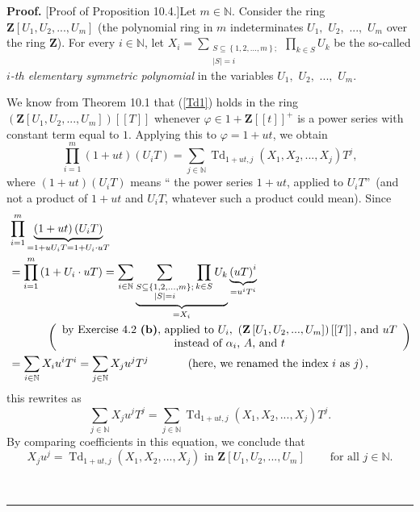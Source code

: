 \documentclass[numbers=enddot,12pt,final,onecolumn,notitlepage]{scrartcl}%
\newenvironment{proof}[1][Proof]{\noindent\textbf{#1.} }{\ \rule{0.5em}{0.5em}}
\begin{document}
\begin{proof}
[Proof of Proposition 10.4.]Let $m\in\mathbb{N}$. Consider the ring
$\mathbf{Z}\left[  U_{1},U_{2},...,U_{m}\right]  $ (the polynomial ring in $m$
indeterminates $U_{1},$ $U_{2},$ $...,$ $U_{m}$ over the ring $\mathbf{Z}$).
For every $i\in\mathbb{N}$, let $X_{i}=\sum\limits_{\substack{S\subseteq
\left\{  1,2,...,m\right\}  ;\\\left\vert S\right\vert =i}}\prod\limits_{k\in
S}U_{k}$ be the so-called $i$\textit{-th elementary symmetric polynomial} in
the variables $U_{1},$ $U_{2},$ $...,$ $U_{m}$.

We know from Theorem 10.1 that (\ref{Td1}) holds in the ring $\left(
\mathbf{Z}\left[  U_{1},U_{2},...,U_{m}\right]  \right)  \left[  \left[
T\right]  \right]  $ whenever $\varphi\in1+\mathbf{Z}\left[  \left[  t\right]
\right]  ^{+}$ is a power series with constant term equal to $1$. Applying
this to $\varphi=1+ut$, we obtain%
\[
\prod\limits_{i=1}^{m}\left(  1+ut\right)  \left(  U_{i}T\right)  =\sum
_{j\in\mathbb{N}}\operatorname*{Td}\nolimits_{1+ut,j}\left(  X_{1}%
,X_{2},...,X_{j}\right)  T^{j},
\]
where $\left(  1+ut\right)  \left(  U_{i}T\right)  $ means \textquotedblleft
the power series $1+ut$, applied to $U_{i}T$\textquotedblright\ (and not a
product of $1+ut$ and $U_{i}T$, whatever such a product could mean). Since%
\begin{align*}
&  \prod\limits_{i=1}^{m}\underbrace{\left(  1+ut\right)  \left(
U_{i}T\right)  }_{=1+uU_{i}T=1+U_{i}\cdot uT}\\
&  =\prod\limits_{i=1}^{m}\left(  1+U_{i}\cdot uT\right)  =\sum_{i\in
\mathbb{N}}\underbrace{\sum_{\substack{S\subseteq\left\{  1,2,...,m\right\}
;\\\left\vert S\right\vert =i}}\prod_{k\in S}U_{k}}_{=X_{i}}%
\underbrace{\left(  uT\right)  ^{i}}_{=u^{i}T^{i}}\\
&  \ \ \ \ \ \ \ \ \ \ \left(
\begin{array}
[c]{c}%
\text{by Exercise 4.2 \textbf{(b)}, applied to }U_{i}\text{, }\left(
\mathbf{Z}\left[  U_{1},U_{2},...,U_{m}\right]  \right)  \left[  \left[
T\right]  \right]  \text{, and }uT\\
\text{instead of }\alpha_{i}\text{, }A\text{, and }t
\end{array}
\right) \\
&  =\sum_{i\in\mathbb{N}}X_{i}u^{i}T^{i}=\sum_{j\in\mathbb{N}}X_{j}u^{j}%
T^{j}\ \ \ \ \ \ \ \ \ \ \left(  \text{here, we renamed the index }i\text{ as
}j\right)  ,
\end{align*}
this rewrites as%
\[
\sum_{j\in\mathbb{N}}X_{j}u^{j}T^{j}=\sum_{j\in\mathbb{N}}\operatorname*{Td}%
\nolimits_{1+ut,j}\left(  X_{1},X_{2},...,X_{j}\right)  T^{j}.
\]
By comparing coefficients in this equation, we conclude that%
\[
X_{j}u^{j}=\operatorname*{Td}\nolimits_{1+ut,j}\left(  X_{1},X_{2}%
,...,X_{j}\right)  \text{ in }\mathbf{Z}\left[  U_{1},U_{2},...,U_{m}\right]
\ \ \ \ \ \ \ \ \ \ \text{for all }j\in\mathbb{N}\text{.}%
\]



\end{proof}
\end{document}
